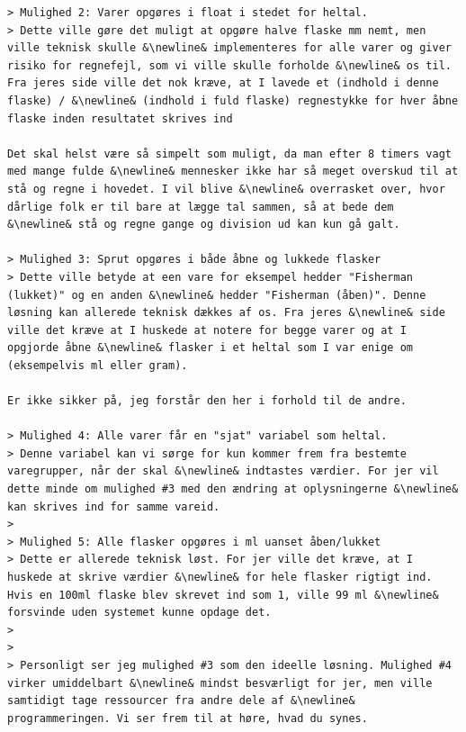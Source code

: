 \documentclass[]{article}
\begin{document}
\begin{lstlisting}[language=Gmail]
> Mulighed 2: Varer opgøres i float i stedet for heltal.
> Dette ville gøre det muligt at opgøre halve flaske mm nemt, men ville teknisk skulle &\newline& implementeres for alle varer og giver risiko for regnefejl, som vi ville skulle forholde &\newline& os til. Fra jeres side ville det nok kræve, at I lavede et (indhold i denne flaske) / &\newline& (indhold i fuld flaske) regnestykke for hver åbne flaske inden resultatet skrives ind

Det skal helst være så simpelt som muligt, da man efter 8 timers vagt med mange fulde &\newline& mennesker ikke har så meget overskud til at stå og regne i hovedet. I vil blive &\newline& overrasket over, hvor dårlige folk er til bare at lægge tal sammen, så at bede dem &\newline& stå og regne gange og division ud kan kun gå galt.

> Mulighed 3: Sprut opgøres i både åbne og lukkede flasker
> Dette ville betyde at een vare for eksempel hedder "Fisherman (lukket)" og en anden &\newline& hedder "Fisherman (åben)". Denne løsning kan allerede teknisk dækkes af os. Fra jeres &\newline& side ville det kræve at I huskede at notere for begge varer og at I opgjorde åbne &\newline& flasker i et heltal som I var enige om (eksempelvis ml eller gram).

Er ikke sikker på, jeg forstår den her i forhold til de andre.

> Mulighed 4: Alle varer får en "sjat" variabel som heltal.
> Denne variabel kan vi sørge for kun kommer frem fra bestemte varegrupper, når der skal &\newline& indtastes værdier. For jer vil dette minde om mulighed #3 med den ændring at oplysningerne &\newline& kan skrives ind for samme vareid.
>
> Mulighed 5: Alle flasker opgøres i ml uanset åben/lukket
> Dette er allerede teknisk løst. For jer ville det kræve, at I huskede at skrive værdier &\newline& for hele flasker rigtigt ind. Hvis en 100ml flaske blev skrevet ind som 1, ville 99 ml &\newline& forsvinde uden systemet kunne opdage det.
>
>
> Personligt ser jeg mulighed #3 som den ideelle løsning. Mulighed #4 virker umiddelbart &\newline& mindst besværligt for jer, men ville samtidigt tage ressourcer fra andre dele af &\newline& programmeringen. Vi ser frem til at høre, hvad du synes.


\end{lstlisting}
\end{document}
